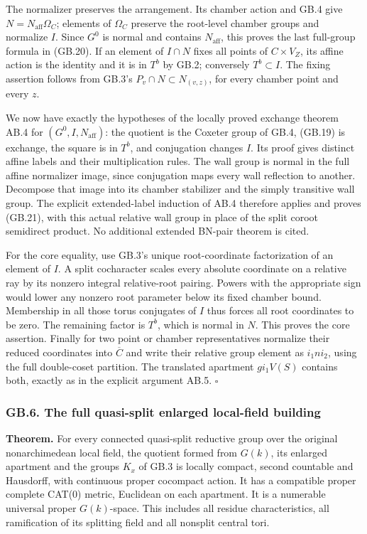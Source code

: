 \documentclass[
  11pt,
]{article}
\begin{document}
The normalizer preserves the arrangement. Its chamber action and GB.4
give \(N=N_{\mathrm{aff}}\Omega_C\); elements of \(\Omega_C\) preserve
the root-level chamber groups and normalize \(I\). Since \(G^0\) is
normal and contains \(N_{\mathrm{aff}}\), this proves the last
full-group formula in (GB.20). If an element of \(I\cap N\) fixes all
points of \(C\times V_Z\), its affine action is the identity and it is
in \(T^b\) by GB.2; conversely \(T^b\subset I\). The fixing assertion
follows from GB.3's \(P_v\cap N\subset N_{(v,z)}\), for every chamber
point and every \(z\).

We now have exactly the hypotheses of the locally proved exchange
theorem AB.4 for \((G^0,I,N_{\mathrm{aff}})\): the quotient is the
Coxeter group of GB.4, (GB.19) is exchange, the square is in \(T^b\),
and conjugation changes \(I\). Its proof gives distinct affine labels
and their multiplication rules. The wall group is normal in the full
affine normalizer image, since conjugation maps every wall reflection to
another. Decompose that image into its chamber stabilizer and the simply
transitive wall group. The explicit extended-label induction of AB.4
therefore applies and proves (GB.21), with this actual relative wall
group in place of the split coroot semidirect product. No additional
extended BN-pair theorem is cited.

For the core equality, use GB.3's unique root-coordinate factorization
of an element of \(I\). A split cocharacter scales every absolute
coordinate on a relative ray by its nonzero integral relative-root
pairing. Powers with the appropriate sign would lower any nonzero root
parameter below its fixed chamber bound. Membership in all those torus
conjugates of \(I\) thus forces all root coordinates to be zero. The
remaining factor is \(T^b\), which is normal in \(N\). This proves the
core assertion. Finally for two point or chamber representatives
normalize their reduced coordinates into \(\overline C\) and write their
relative group element as \(i_1ni_2\), using the full double-coset
partition. The translated apartment \(gi_1V(S)\) contains both, exactly
as in the explicit argument AB.5. \(\square\)

\subsubsection{GB.6. The full quasi-split enlarged local-field
building}\label{gb.6.-the-full-quasi-split-enlarged-local-field-building}

\textbf{Theorem.} For every connected quasi-split reductive group over
the original nonarchimedean local field, the quotient formed from
\(G(k)\), its enlarged apartment and the groups \(K_x\) of GB.3 is
locally compact, second countable and Hausdorff, with continuous proper
cocompact action. It has a compatible proper complete CAT(0) metric,
Euclidean on each apartment. It is a numerable universal proper
\(G(k)\)-space. This includes all residue characteristics, all
ramification of its splitting field and all nonsplit central tori.
\end{document}
